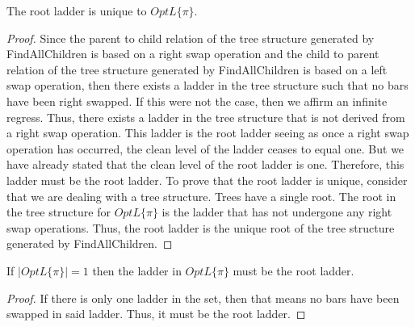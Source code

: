 \begin{theorem}
	 The root ladder is unique to $OptL\{\pi\}$. 
	 \label{Theorem:One}
 \end{theorem} 
 \begin{proof}
	Since the parent to child relation of the tree structure generated by {\sc FindAllChildren} is based on a right swap operation 
	and the child to parent relation of the tree structure generated by {\sc FindAllChildren} is based on a left swap operation, then 
	there exists a ladder in the tree structure such that no bars have been right swapped. 
	If this were not the case, then we affirm an infinite regress. 
	Thus, there exists a ladder in the tree structure that is not derived from a right swap operation. This ladder 
	is the root ladder seeing as once a right swap operation has occurred, the clean level of the ladder 
	ceases to equal one. But we have already stated that the clean level of the root ladder is one. Therefore, 
	this ladder must be the root ladder. To prove that 
	the root ladder is unique, consider that we are dealing with a tree structure. Trees have a single 
	root. The root in the tree structure for $OptL\{\pi\}$ is the ladder that has not undergone any right swap operations.
	Thus, the root ladder is the unique root of the tree structure generated by {\sc FindAllChildren}.
   
 \end{proof}
 \begin{corollary}
	 If $|OptL\{\pi\}|=1$ then the ladder in $OptL\{\pi\}$ must be the root ladder.
 \end{corollary}
 \begin{proof}
	 If there is only one ladder in the set, then that means no bars have been swapped in said ladder. 
	 Thus, it must be the root ladder.
 \end{proof}

